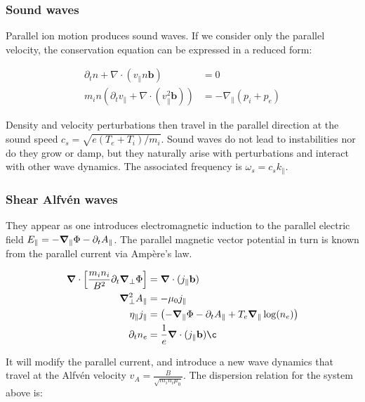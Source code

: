 \subsubsection{Sound waves}

Parallel ion motion produces sound waves. If we consider only the parallel velocity, the conservation equation can be expressed in a reduced form:

\begin{align}
	\partial_t n + \nabla \cdot (v_\parallel n\mathbf{b}) &= 0 \\
	m_i n \left(\partial_t v_\parallel + \nabla \cdot \left(v_\parallel^2 \mathbf{b}\right)\right) &= -\nabla_\parallel (p_i + p_e)
\end{align}

Density and velocity perturbations then travel in the parallel direction at the sound speed $ c_s = \sqrt{e(T_e + T_i)/m_i} $. Sound waves do not lead to instabilities nor do they grow or damp, but they naturally arise with perturbations and interact with other wave dynamics. The associated frequency is $\omega_s = c_s k_\parallel$.



\subsubsection{Shear Alfvén waves}
\label{ssec:edge_shearAlfvenWaves}

They appear as one introduces electromagnetic induction to the parallel electric field $E_\parallel = -\grad_\parallel \Phi - \partial_t A_\parallel$. The parallel magnetic vector potential in turn is known from the parallel current via Ampère's law.

\begin{align}
	\grad\cdot\left[\frac{m_i n_i}{ B^2}\partial_t\grad_\perp\Phi\right] &= \grad\cdot(j_\parallel\mathbf{b}) \\
	\grad^2_\perp A_\parallel &= -\mu_0j_\parallel \\
	\eta_\parallel j_\parallel &= \left(-\grad_\parallel\Phi - \partial_t A_\parallel + T_e\grad_\parallel\log(n_e)\right) \\
	\partial_t n_e &= \frac{1}{e}\grad\cdot (j_\parallel\mathbf{b}) ¸
	\label{eq:fourFieldModel}
\end{align}

It will modify the parallel current, and introduce a new wave dynamics that travel at the Alfvén velocity $v_A = \frac{B}{\sqrt{m_in_i\mu_0}}$. The dispersion relation for the system above is:

